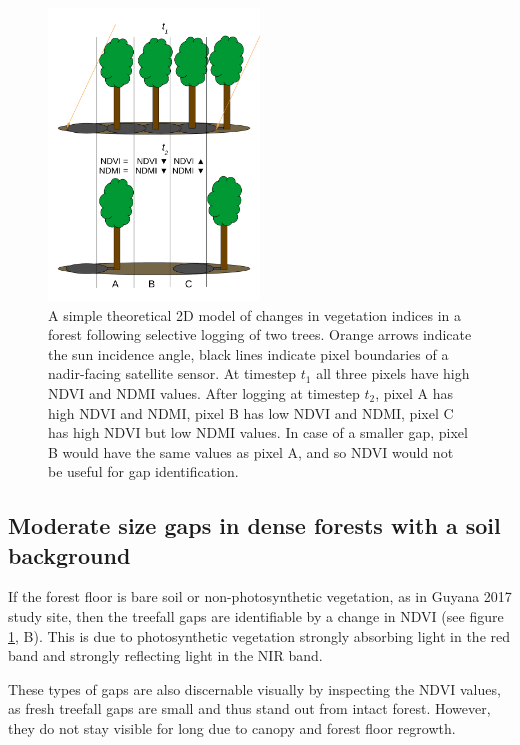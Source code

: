 \documentclass[a4paper,12pt]{scrbook}
\begin{document}
\begin{figure}
  \centering
  \includegraphics[width=0.5\textwidth]{thesis-figures/15-gap-vi-model}
  \caption{A simple theoretical 2D model of changes in vegetation indices in a forest following selective logging of two trees. Orange arrows indicate the sun incidence angle, black lines indicate pixel boundaries of a nadir-facing satellite sensor. At timestep $ t_{1} $ all three pixels have high \ac{NDVI} and \ac{NDMI} values. After logging at timestep $ t_{2} $, pixel A has high \ac{NDVI} and \ac{NDMI}, pixel B has low \ac{NDVI} and \ac{NDMI}, pixel C has high \ac{NDVI} but low \ac{NDMI} values. In case of a smaller gap, pixel B would have the same values as pixel A, and so \ac{NDVI} would not be useful for gap identification.}
  \label{fig-gap-vi-model}
\end{figure}

\subsection{Moderate size gaps in dense forests with a soil background}


If the forest floor is bare soil or non-photosynthetic vegetation, as in Guyana 2017 study site, then the treefall gaps are identifiable by a change in \ac{NDVI} (see figure \ref{fig-gap-vi-model}, B). This is due to photosynthetic vegetation strongly absorbing light in the red band and strongly reflecting light in the \ac{NIR} band.

These types of gaps are also discernable visually by inspecting the \ac{NDVI} values, as fresh treefall gaps are small and thus stand out from intact forest. However, they do not stay visible for long due to canopy and forest floor regrowth.
\end{document}
